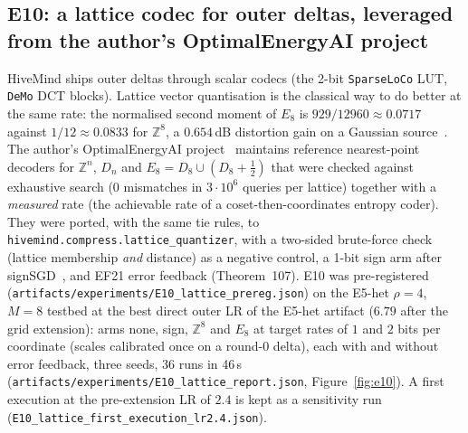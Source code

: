 \documentclass[11pt,a4paper]{article}
\begin{document}
\subsection{E10: a lattice codec for outer deltas, leveraged from the author's OptimalEnergyAI project}
\label{sec:e10}

HiveMind ships outer deltas through scalar codecs (the 2-bit \texttt{SparseLoCo} LUT, \texttt{DeMo} DCT blocks). Lattice vector quantisation is the classical way to do better at the same rate: the normalised second moment of $E_8$ is $929/12960 \approx 0.0717$ against $1/12 \approx 0.0833$ for $\mathbb{Z}^8$, a $0.654$\,dB distortion gain on a Gaussian source~\cite{conway1982fast}. The author's OptimalEnergyAI project~\cite{callens2026triangular} maintains reference nearest-point decoders for $\mathbb{Z}^n$, $D_n$ and $E_8 = D_8 \cup (D_8 + \tfrac12)$ that were checked against exhaustive search (0 mismatches in $3\cdot 10^6$ queries per lattice) together with a \emph{measured} rate (the achievable rate of a coset-then-coordinates entropy coder). They were ported, with the same tie rules, to \texttt{hivemind.compress.lattice\_quantizer}, with a two-sided brute-force check (lattice membership \emph{and} distance) as a negative control, a 1-bit sign arm after signSGD~\cite{bernstein2018signsgd}, and EF21 error feedback (Theorem~107). E10 was pre-registered (\texttt{artifacts/experiments/E10\_lattice\_prereg.json}) on the E5-het $\rho = 4$, $M=8$ testbed at the best direct outer LR of the E5-het artifact ($6.79$ after the grid extension): arms none, sign, $\mathbb{Z}^8$ and $E_8$ at target rates of $1$ and $2$ bits per coordinate (scales calibrated once on a round-0 delta), each with and without error feedback, three seeds, 36 runs in 46\,s (\texttt{artifacts/experiments/E10\_lattice\_report.json}, Figure~\ref{fig:e10}). A first execution at the pre-extension LR of $2.4$ is kept as a sensitivity run (\texttt{E10\_lattice\_first\_execution\_lr2.4.json}).
\end{document}
